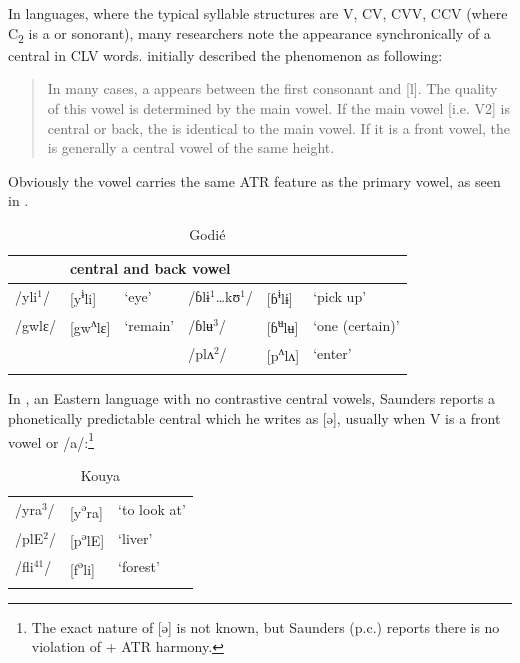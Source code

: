\documentclass[output=paper,newtxmath,modfonts,nonflat]{langsci/langscibook}
\begin{document}
In  languages, where the typical syllable structures are V, CV, CVV, CCV (where C\textsubscript{2} is a  or sonorant), many researchers note the appearance synchronically of a central  in CLV words.  \citet[98]{Marchese1979/1983} initially described the phenomenon as following:  
\begin{quote}
In many cases, a  appears between the first consonant and [l]. The quality of this vowel is determined by the main vowel.  If the main vowel [i.e. V2] is central or back, the  is identical to the main vowel.  If it is a front vowel, the  is generally a central vowel of the same height. 
\end{quote}

Obviously the vowel carries the same ATR feature as the primary vowel, as seen in .

\begin{table}
\caption{Godié}
\label{tab:zogbo:20}
\begin{tabular}{llllll}
\lsptoprule
\multicolumn{3}{l}{front vowel} & \multicolumn{3}{l}{central and back vowel}\\
\midrule
/yli$^1$/  & [y\textsuperscript{ɨ}li]  &  ‘eye’  &  /ɓlɨ$^1$…kʊ$^1$/ & [ɓ\textsuperscript{ɨ}lɨ] & ‘pick up’\\

/gwlɛ/ & [gw\textsuperscript{ʌ}lɛ] & ‘remain’ & /ɓlʉ$^3$/  &  [ɓ\textsuperscript{ʉ}lʉ]  & ‘one (certain)’\\

&&& /plʌ$^2$/  &  [p\textsuperscript{ʌ}lʌ]  & ‘enter’\\
\lspbottomrule
\end{tabular} 
\end{table}

In , an Eastern language with no contrastive central vowels, Saunders reports a phonetically predictable central  which he writes as [ə], {usually when V is a front vowel or /a/}:\footnote{The exact nature of [ə] is not known, but Saunders (p.c.) reports there is no violation of + ATR harmony.}

\begin{table}
\caption{Kouya \citep{Saunders2009}}
\label{tab:zogbo:21}
	\begin{tabular}{p{1.5cm}ll}
\lsptoprule
{/yra}{$^3$}{/} &   {[y}{\textsuperscript{ə}}{ra]} & {‘to look at’}\\

{/plE}{$^2$}{/}  &  {[p}{\textsuperscript{ə}}{lE]} & {‘liver’} \\

{/fli}{$^{41}$}{/}  &  {[f}{\textsuperscript{ə}}{li]} & {‘forest’} \\
\lspbottomrule
	\end{tabular}
\end{table}
\end{document}
